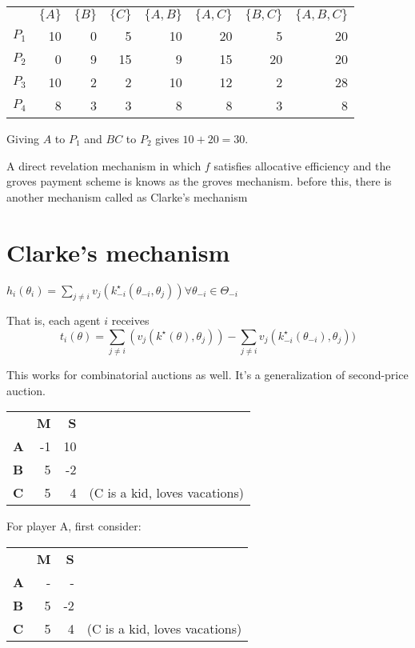 \documentclass[10pt,a4paper]{article}
\begin{document}
\begin{tabular}{l r r r r r r r}
    & $\{ A \}$  & $\{ B \}$   & $\{ C \}$  &  $\{ A, B \}$ & $\{ A, C \}$ & $\{ B, C  \}$ & $\{  A, B, C \}$ \\
$P_1$  & 10 & 0   & 5  &  10  &  20 &   5  &  20 \\
$P_2$  & 0  & 9   & 15  &  9  &  15 &  20  &  20 \\
$P_3$  & 10 &  2   & 2  &  10  &  12 &  2  &   28 \\
$P_4$  & 8  &  3   & 3  &  8  &   8 &   3  &    8
\end{tabular}


Giving $A$ to $P_1$ and $BC$ to $P_2$ gives $10 + 20 = 30$.


A direct revelation mechanism in which $f$ satisfies allocative efficiency
and the groves payment scheme is knows as the groves mechanism.
before this, there is another mechanism called as Clarke's mechanism

\section{Clarke's mechanism}

$h_i(\theta_i) = \sum_{j \neq i} v_j(k_{-i}^\star(\theta_{-i}, \theta_j)) \forall \theta_{-i} \in \Theta_{-i}$

That is, each agent $i$ receives
$$
t_i(\theta) = \sum_{j \neq i}(v_j(k^\star(\theta), \theta_j)) - \sum_{j \neq i} v_j(k^\star_{-i}(\theta_{-i}), \theta_j))
$$

This works for combinatorial auctions as well. It's a generalization
of second-price auction.

\begin{tabular}{l r r l}
            & \textbf{M} & \textbf{S} & \\
\textbf{A} &-1  &10 &  \\
\textbf{B} & 5  &-2 & \\
\textbf{C} & 5 & 4 &  (C is a kid, loves vacations) \\
\end{tabular}

For player A, first consider:

\begin{tabular}{l r r l}
& \textbf{M}  & \textbf{S} & \\
\textbf{A}  & -  & -  & \\
\textbf{B}  & 5  & -2 & \\
\textbf{C}  & 5  & 4  & (C is a kid, loves vacations) \\
\end{tabular}
\end{document}
